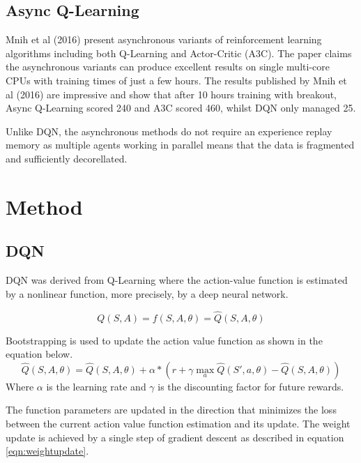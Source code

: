 \documentclass{article}
\begin{document}
\subsection{Async Q-Learning}

Mnih et al (2016) present asynchronous variants of reinforcement learning algorithms including both Q-Learning and Actor-Critic (A3C).
The paper claims the asynchronous variants can produce excellent results on single multi-core CPUs with training times of just a few hours. The results published by Mnih et al (2016) are impressive and show that after 10 hours training with breakout, Async Q-Learning scored 240 and A3C scored 460, whilst DQN only managed 25.

Unlike DQN, the asynchronous methods do not require an experience replay memory as multiple agents working in parallel means that the data is fragmented and sufficiently decorellated.

\section{Method}
\subsection{DQN}

DQN was derived from Q-Learning where the action-value function is estimated by a nonlinear function, more precisely, by a deep neural network.

\begin{equation}
Q(S,A) = f(S,A,\theta) = \hat{Q}(S,A,\theta)
\end{equation}

Bootstrapping is used to update the action value function as shown in the equation below.
\begin{equation}
\hat{Q}(S,A,\theta) = \hat{Q}(S,A,\theta) + \alpha * \left( r + \gamma \max_{a} \hat{Q}(S',a,\theta) - \hat{Q}(S,A,\theta) \right)
\end{equation}
Where $\alpha$ is the learning rate and $\gamma$ is the discounting factor for future rewards.

The function parameters are updated in the direction that minimizes the loss between the current action value function estimation and its update. The weight update is achieved by a single step of gradient descent as described in equation \ref{eqn:weightupdate}.
\end{document}
